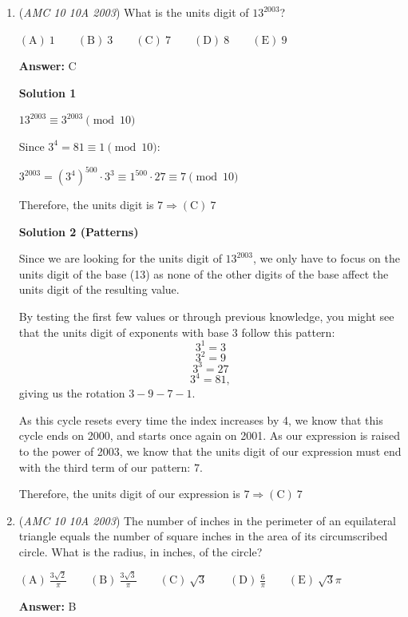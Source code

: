 \begin{enumerate}
 


	\item (\textit{AMC 10 10A 2003}) What is the units digit of $13^{2003}$?


 $\mathrm{(A) \ } 1\qquad \mathrm{(B) \ } 3\qquad \mathrm{(C) \ } 7\qquad \mathrm{(D) \ } 8\qquad \mathrm{(E) \ } 9$

 \textbf{Answer: }C



\textbf{Solution 1}

$13^{2003}\equiv 3^{2003}\pmod{10}$

 Since $3^4=81\equiv1\pmod{10}$: 

 $3^{2003}=(3^{4})^{500}\cdot3^{3}\equiv1^{500}\cdot27\equiv7\pmod{10}$

 Therefore, the units digit is $7 \Rightarrow\boxed{\mathrm{(C)}\ 7}$




\textbf{Solution 2 (Patterns)}

Since we are looking for the units digit of $13^{2003}$, we only have to focus on the units digit of the base (13) as none of the other digits of the base affect the units digit of the resulting value.

 By testing the first few values or through previous knowledge, you might see that the units digit of exponents with base 3 follow this pattern: 
 \[3^1=3\]
 \[3^2=9\] 
 \[3^3=27\]
 \[3^4=81,\]giving us the rotation $3-9-7-1.$

 As this cycle resets every time the index increases by 4, we know that this cycle ends on 2000, and starts once again on 2001. As our expression is raised to the power of 2003, we know that the units digit of our expression must end with the third term of our pattern: $7$.

 Therefore, the units digit of our expression is $7 \Rightarrow\boxed{\mathrm{(C)}\ 7}$



	\item (\textit{AMC 10 10A 2003}) The number of inches in the perimeter of an equilateral triangle equals the number of square inches in the area of  its circumscribed circle. What is the radius, in inches, of the circle? 


 $\mathrm{(A) \ } \frac{3\sqrt{2}}{\pi}\qquad \mathrm{(B) \ }  \frac{3\sqrt{3}}{\pi}\qquad \mathrm{(C) \ } \sqrt{3}\qquad \mathrm{(D) \ } \frac{6}{\pi}\qquad \mathrm{(E) \ } \sqrt{3}\pi$

 \textbf{Answer: }B




\end{enumerate}
